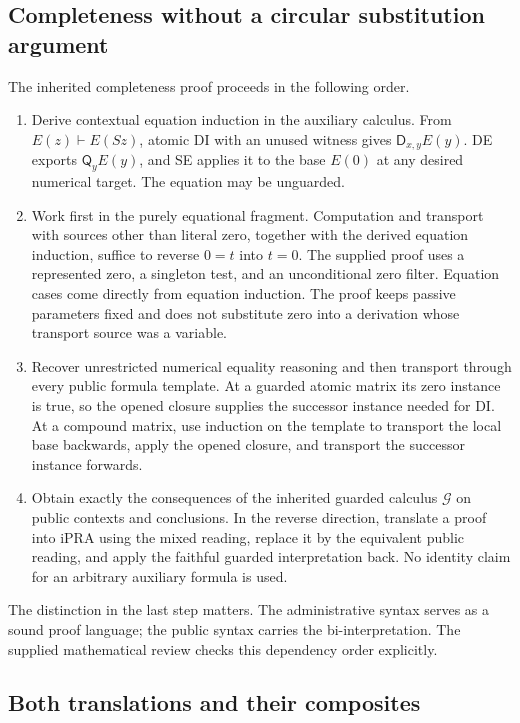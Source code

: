 \documentclass[11pt,letterpaper]{article}
\theoremstyle{definition}\newtheorem{definition}[theorem]{Definition}
\theoremstyle{remark}\newtheorem{remark}[theorem]{Remark}
\newcommand{\Gcal}{\mathcal G}
\newcommand{\Q}{\mathsf Q}
\newcommand{\D}{\mathsf D}
\begin{document}
\subsection{Completeness without a circular substitution argument}

The inherited completeness proof proceeds in the following order.

\begin{enumerate}
\item Derive contextual equation induction in the auxiliary calculus.
From $E(z)\vdash E(Sz)$, atomic DI with an unused witness gives
$\D_{x,y}E(y)$. DE exports $\Q_yE(y)$, and SE applies it to the
base $E(0)$ at any desired numerical target. The equation may be unguarded.

\item Work first in the purely equational fragment. Computation and
transport with sources other than literal zero, together with the derived
equation induction, suffice to reverse $0=t$ into $t=0$. The supplied proof
uses a represented zero, a singleton test, and an unconditional zero filter.
Equation cases come directly from equation induction. The proof keeps
passive parameters fixed and does not substitute zero into a derivation
whose transport source was a variable.

\item Recover unrestricted numerical equality reasoning and then
transport through every public formula template. At a guarded atomic
matrix its zero instance is true, so the opened closure supplies the
successor instance needed for DI. At a compound matrix, use induction on
the template to transport the local base backwards, apply the opened
closure, and transport the successor instance forwards.

\item Obtain exactly the consequences of the inherited guarded calculus
$\Gcal$ on public contexts and conclusions. In the reverse direction,
translate a proof into iPRA using the mixed reading, replace it by the
equivalent public reading, and apply the faithful guarded interpretation
back. No identity claim for an arbitrary auxiliary formula is used.
\end{enumerate}

The distinction in the last step matters. The administrative syntax serves
as a sound proof language; the public syntax carries the bi-interpretation.
The supplied mathematical review checks this dependency order explicitly.

\subsection{Both translations and their composites}
\end{document}
